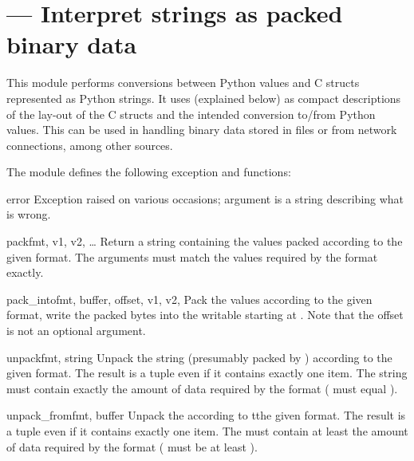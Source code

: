 \section{ ---
         Interpret strings as packed binary data}



This module performs conversions between Python values and C
structs represented as Python strings.  It uses 
(explained below) as compact descriptions of the lay-out of the C
structs and the intended conversion to/from Python values.  This can
be used in handling binary data stored in files or from network
connections, among other sources.

The module defines the following exception and functions:


\begin{excdesc}{error}
  Exception raised on various occasions; argument is a string
  describing what is wrong.
\end{excdesc}

\begin{funcdesc}{pack}{fmt, v1, v2, \textrm{\ldots}}
  Return a string containing the values
   packed according to the given
  format.  The arguments must match the values required by the format
  exactly.
\end{funcdesc}

\begin{funcdesc}{pack_into}{fmt, buffer, offset, v1, v2, \moreargs}
  Pack the values  according to the given
  format, write the packed bytes into the writable  starting at
  .
  Note that the offset is not an optional argument.
\end{funcdesc}

\begin{funcdesc}{unpack}{fmt, string}
  Unpack the string (presumably packed by ) according to the given format.  The result is a
  tuple even if it contains exactly one item.  The string must contain
  exactly the amount of data required by the format
  ( must equal ).
\end{funcdesc}

\begin{funcdesc}{unpack_from}{fmt, buffer}
  Unpack the  according to tthe given format.
  The result is a tuple even if it contains exactly one item. The
   must contain at least the amount of data required by the
  format ( must be at least
  ).
\end{funcdesc}

